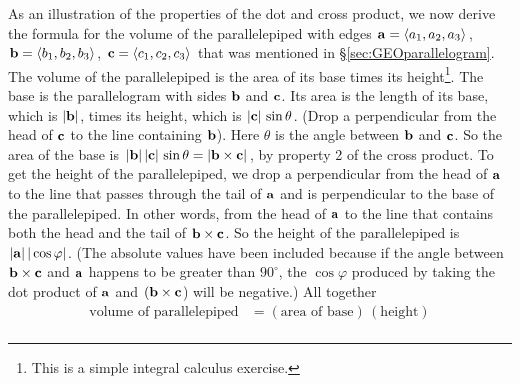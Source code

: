 \begin{eg}\label{eg:GEOcross}
As an illustration of the properties of the dot and cross product, we now
derive the formula for the volume of the parallelepiped with edges 
$\mathbf{a}=\left< a_1,a_2,a_3\right> $, $\mathbf{b} = \left< b_1,b_2,b_3\right> $, 
$\mathbf{c} = \left< c_1,c_2,c_3\right> $ that was mentioned in 
\S\ref{sec:GEOparallelogram}.
%
The volume of the parallelepiped is the area of its base times its 
height\footnote{This is a simple integral calculus exercise.}.
The base is the parallelogram with sides $\mathbf{b}$ and
$\mathbf{c}$. Its area is the length of its base, which is $|\mathbf{b}|$,
times its height, which is $|\mathbf{c}|\,\sin\theta$. (Drop a 
perpendicular from the head of $\mathbf{c}$ to the line containing $\mathbf{b}$). 
Here $\theta$ is the angle between $\mathbf{b}$ and $\mathbf{c}$. So the area of the 
base is $|\mathbf{b}|\,|\mathbf{c}|\,\sin\theta= |\mathbf{b}\times\mathbf{c}|$, by 
property 2 of the cross product. To get the height of the parallelepiped, 
we drop a perpendicular from the head of $\mathbf{a}$ to the line that passes 
through the tail of $\mathbf{a}$ and is perpendicular to the base of the parallelepiped. In other words, from
the head of $\mathbf{a}$ to the line that contains both the head and the tail
of $\mathbf{b}\times\mathbf{c}$. So the height of the parallelepiped is
$|\mathbf{a}|\,|\cos\varphi|$.  (The absolute values have been included because 
if the angle between $\mathbf{b}\times\mathbf{c}$ and $\mathbf{a}$ happens to be greater
than $90^\circ$, the $\cos\varphi$ produced by taking the dot product of 
$\mathbf{a}$ and  $(\mathbf{b}\times\mathbf{c}$) will be negative.) All together
\begin{align*}
\text{volume of parallelepiped}
&=(\text{area of base})\,(\text{height})\\

\end{align*}
\end{eg}
